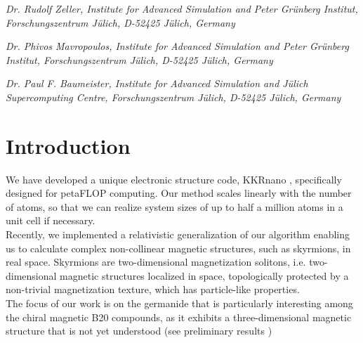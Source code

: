 \documentclass [a4paper, 12pt]{article}
\begin{document}
\phantom{MM} \textit{Dr. Rudolf Zeller,
Institute for Advanced Simulation and Peter Gr\"unberg Institut, Forschungszentrum J\"ulich, D-52425 J\"ulich, Germany
}

\phantom{MM} \textit{Dr. Phivos Mavropoulos,
Institute for Advanced Simulation and Peter Gr\"unberg Institut, Forschungszentrum J\"ulich, D-52425 J\"ulich, Germany
}

\phantom{MM} \textit{Dr. Paul F. Baumeister,
Institute for Advanced Simulation and J\"ulich Supercomputing Centre, Forschungszentrum J\"ulich, D-52425 J\"ulich, Germany
}


\newpage

\vfill
\tableofcontents
\vfill

\newpage


\section{Introduction}
We have developed a unique electronic structure code, 
KKRnano \cite{zeller_towards_2008,thiess_massively_2012},
specifically designed for petaFLOP computing. Our method scales linearly
with the number of atoms, so that we can realize system sizes of up to 
half a million atoms in a unit cell if necessary.
\\
Recently, we implemented a relativistic generalization of our algorithm 
enabling us to calculate complex non-collinear magnetic structures, such as skyrmions,
in real space. Skyrmions are two-dimensional magnetization solitons, i.e. two-dimensional
magnetic structures localized in space, topologically protected by a non-trivial
magnetization texture, which has particle-like properties. 
\\
The focus of our work is on the germanide  that is particularly
interesting among the chiral magnetic B20 compounds, as it exhibits a three-dimensional magnetic structure
that is not yet understood (see preliminary results
\cite{tanigaki_real-space_2015,rybakov_new_2016,bornemann_investigation_2017})\\
\end{document}
